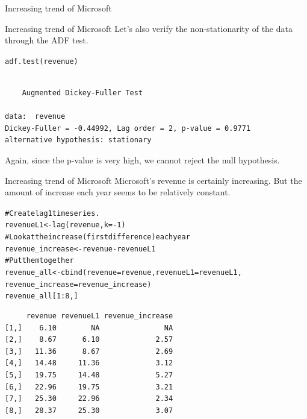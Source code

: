 \documentclass{beamer}\usepackage[]{graphicx}\usepackage[]{color}
\makeatletter
\newcommand{\hlnum}[1]{\textcolor[rgb]{0.824,0.412,0.118}{#1}}%
\newcommand{\hlcom}[1]{\textcolor[rgb]{0.824,0.706,0.549}{#1}}%
\newcommand{\hlopt}[1]{\textcolor[rgb]{1,0.894,0.769}{#1}}%
\newcommand{\hlstd}[1]{\textcolor[rgb]{1,0.894,0.769}{#1}}%
\newcommand{\hlkwb}[1]{\textcolor[rgb]{0.804,0.776,0.451}{#1}}%
\newcommand{\hlkwc}[1]{\textcolor[rgb]{0.78,0.941,0.545}{#1}}%
\newcommand{\hlkwd}[1]{\textcolor[rgb]{1,0.78,0.769}{#1}}%
\newenvironment{kframe}{%
 \def\at@end@of@kframe{}%
 \ifinner\ifhmode%
  \def\at@end@of@kframe{\end{minipage}}%
  \begin{minipage}{\columnwidth}%
 \fi\fi%
 \def\FrameCommand##1{\hskip\@totalleftmargin \hskip-\fboxsep
 \colorbox{shadecolor}{##1}\hskip-\fboxsep
     \hskip-\linewidth \hskip-\@totalleftmargin \hskip\columnwidth}%
 \MakeFramed {\advance\hsize-\width
   \@totalleftmargin\z@ \linewidth\hsize
   \@setminipage}}%
 {\par\unskip\endMakeFramed%
 \at@end@of@kframe}
\newenvironment{knitrout}{}{} %
\makeatother
\begin{document}
\begin{darkframes}
\begin{frame}[fragile]{Increasing trend of Microsoft}
\begin{knitrout}
\end{knitrout}
    \end{frame}
    
    
    \begin{frame}[fragile]{Increasing trend of Microsoft}
    \fontsize{9}{9}\selectfont
      Let's also verify the non-stationarity of the data through the ADF test. \pause
    \bigskip
\begin{knitrout}
\begin{kframe}
\begin{alltt}
\hlkwd{adf.test}\hlstd{(revenue)}
\end{alltt}
\begin{verbatim}

	Augmented Dickey-Fuller Test

data:  revenue
Dickey-Fuller = -0.44992, Lag order = 2, p-value = 0.9771
alternative hypothesis: stationary
\end{verbatim}
\end{kframe}
\end{knitrout}
      \pause
      
      Again, since the p-value is very high, we cannot reject the null hypothesis.
      \lc
    \end{frame}
    
    
    \begin{frame}[fragile]{Increasing trend of Microsoft}
    \fontsize{9}{9}\selectfont
      Microsoft's revenue is certainly increasing. But the amount of increase each year seems to be relatively constant.
\begin{knitrout}
\begin{kframe}
\begin{alltt}
\hlcom{# Create lag 1 time series.}
\hlstd{revenueL1} \hlkwb{<-} \hlkwd{lag}\hlstd{(revenue,} \hlkwc{k}\hlstd{=}\hlopt{-}\hlnum{1}\hlstd{)}
\hlcom{# Look at the increase (first difference) each year}
\hlstd{revenue_increase} \hlkwb{<-} \hlstd{revenue} \hlopt{-} \hlstd{revenueL1}
\hlcom{# Put them together}
\hlstd{revenue_all} \hlkwb{<-} \hlkwd{cbind}\hlstd{(}\hlkwc{revenue}\hlstd{=revenue,} \hlkwc{revenueL1}\hlstd{=revenueL1,}
                     \hlkwc{revenue_increase}\hlstd{=revenue_increase)}
\hlstd{revenue_all[}\hlnum{1}\hlopt{:}\hlnum{8}\hlstd{,]}
\end{alltt}
\begin{verbatim}
     revenue revenueL1 revenue_increase
[1,]    6.10        NA               NA
[2,]    8.67      6.10             2.57
[3,]   11.36      8.67             2.69
[4,]   14.48     11.36             3.12
[5,]   19.75     14.48             5.27
[6,]   22.96     19.75             3.21
[7,]   25.30     22.96             2.34
[8,]   28.37     25.30             3.07
\end{verbatim}
\end{kframe}
\end{knitrout}
    \end{frame}
    

\end{darkframes}
\end{document}
